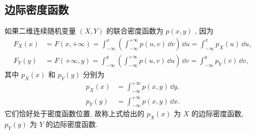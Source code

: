   \subsection{边际密度函数}\label{ssec:3.2.3}
  如果二维连续随机变量 $(X,Y)$ 的联合密度函数为 $p(x,y)$ , 因为
  \begin{align*}
  F_{X}(x) &= F(x,+\infty)=\int_{-\infty}^{x}\left( \int_{-\infty}^{+\infty}p(u,v)\,\dd v \right)\,\dd u=\int_{-\infty}^{x}p_{X}(u)\,\dd u,\\
  F_{Y}(y) &= F(+\infty,y)=\int_{-\infty}^{y}\left( \int_{-\infty}^{+\infty}p(u,v)\,\dd u \right)\,\dd v=\int_{-\infty}^{y}p_{Y}(v)\,\dd v,
  \end{align*}
  其中 $p_{X}(x)$ 和 $p_{Y}(y)$ 分别为
  \begin{align}
  p_{X}(x) &= \int_{-\infty}^{+\infty}p(x,y)\,\dd y.\label{eq:3.2.5}\\
  p_{Y}(y) &= \int_{-\infty}^{+\infty}p(x,y)\,\dd x.\label{eq:3.2.6}
  \end{align}
  它们恰好处于密度函数位置, 故称上式给出的 $p_{X}(x)$ 为 $X$ 的边际密度函数, $p_{Y}(y)$ 为 $Y$ 的边际密度函数.

